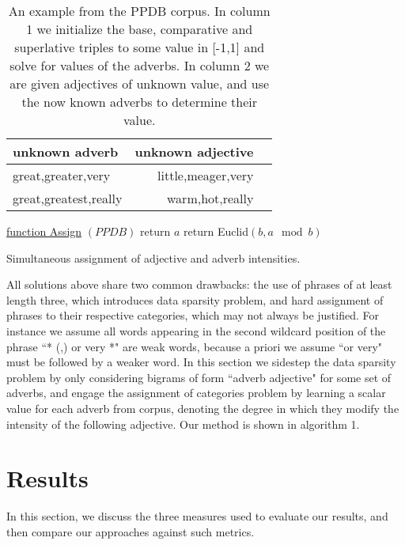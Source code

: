 \documentclass[11pt,letterpaper]{article}
\begin{document}
\begin{table}
\small
\centering
\begin{tabular}{|l|rl|}
\hline \bf unknown adverb & \bf unknown adjective & \\ \hline
great,greater,very     & little,meager,very  & \\
great,greatest,really  & warm,hot,really     & \\
\hline
\end{tabular}
\caption{\label{font-table} An example from the PPDB corpus. In column 1 we initialize the base, comparative and superlative triples to some value in [-1,1] and solve for values of the adverbs. In column 2 we are given adjectives of unknown value, and use the now known adverbs to determine their value.}
\end{table}

\begin{algorithm}

    \underline{function Assign} $(PPDB)$\;
      {
        return $a$\;
      }
      {
        return Euclid$(b,a\mod b)$\;
      }
    \caption{Simultaneous assignment of adjective and adverb intensities.}
\end{algorithm}


All solutions above share two common drawbacks: the use of phrases of at least length three, which introduces data sparsity problem, and hard assignment of phrases to their respective categories, which may not always be justified. For instance we assume all words appearing in the second wildcard position of the phrase ``* (,) or very *"  are weak words, because a priori we assume ``or very" must be followed by a weaker word. In this section we sidestep the data sparsity problem by only considering bigrams of form ``adverb adjective" for some set of adverbs, and engage the assignment of categories problem by learning a scalar value for each adverb from corpus, denoting the degree in which they modify the intensity of the following adjective. Our method is shown in algorithm 1. 


\section{Results}

In this section, we discuss the three measures used to evaluate our results, and then compare our approaches against such metrics. 
\end{document}
